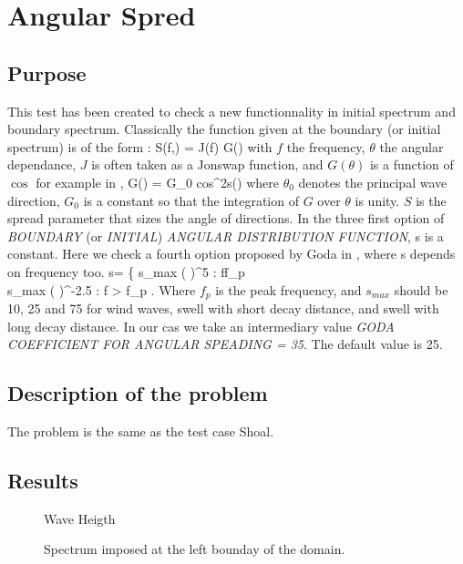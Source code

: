 \chapter{Angular Spred}
\section{Purpose}
This test has been created to check a new functionnality in initial spectrum and boundary spectrum.
Classically the function given at the boundary (or initial spectrum) is of the form :
\bequ
S(f,\theta) = J(f) G(\theta)
\eequ
with $f$ the frequency, $\theta$ the angular dependance, $J$ is often taken as a Jonswap function, and $G(\theta)$ is a function of $\cos$ for example in \cite{Mitsuyasu1975},
\bequ
G(\theta) = G_0 cos^{2s}\left(\right)
\eequ
where $\theta_0$ denotes the principal wave direction, $G_0$ is a constant so that the integration of $G$ over $\theta$ is unity. $S$ is the spread parameter that sizes the angle of directions. In the three first option of {\it BOUNDARY} (or {\it INITIAL}) {\it ANGULAR DISTRIBUTION FUNCTION}, s is a constant. Here we check a fourth option proposed by Goda in \cite{Goda1975}, where s depends on frequency too.
\bequ
s= \left\{  s_{max} \left( \right)^5 : f\le f_p \\
 s_{max} \left( \right)^{-2.5} : f > f_p \earr\right.
 \eequ
 Where $f_p$ is the peak frequency, and $s_{max}$ should be 10, 25 and 75 for wind waves, swell with short decay distance, and swell with long decay distance. In our cas we take an intermediary value {\it GODA COEFFICIENT FOR ANGULAR SPEADING = 35}. The default value is 25. 

\section{Description of the problem}
The problem is the same as the test case Shoal. 

\section{Results}

\begin{figure} [!h]
\centering
{}
 \caption{Wave Heigth}
\label{figresAngularSpred}
\end{figure}

\begin{figure} [!h]
\centering
{}
 \caption{Spectrum imposed at the left bounday of the domain.}
\label{figresAngularSpectrum}
\end{figure}

